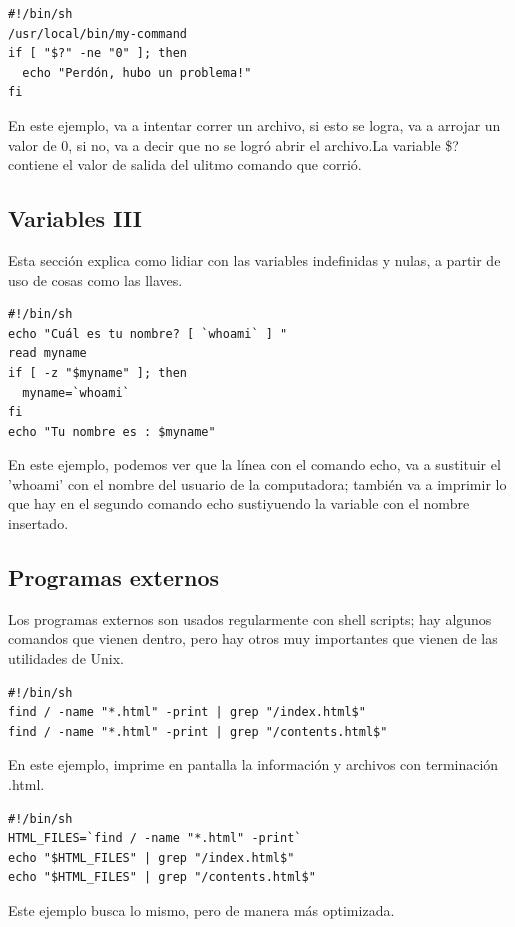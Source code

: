 \documentclass[a4paper]{article}
\begin{document}
\begin{verbatim}
#!/bin/sh
/usr/local/bin/my-command
if [ "$?" -ne "0" ]; then
  echo "Perdón, hubo un problema!"
fi
\end{verbatim}
En este ejemplo, va a intentar correr un archivo, si esto se logra, va a arrojar un valor de 0, si no, va a decir que no se logró abrir el archivo.La variable \$? contiene el valor de salida del ulitmo comando que corrió.

\subsection{Variables III}
Esta sección explica como lidiar con las variables indefinidas y nulas, a partir de uso de cosas como las llaves.

\begin{verbatim}
#!/bin/sh
echo "Cuál es tu nombre? [ `whoami` ] "
read myname
if [ -z "$myname" ]; then
  myname=`whoami`
fi
echo "Tu nombre es : $myname"
\end{verbatim}
En este ejemplo, podemos ver que la línea con el comando echo, va a sustituir el 'whoami' con el nombre del usuario de la computadora; también va a imprimir lo que hay en el segundo comando echo sustiyuendo la variable con el nombre insertado. 
\subsection{Programas externos}
Los programas externos son usados regularmente con shell scripts; hay algunos comandos que vienen dentro, pero hay otros muy importantes que vienen de las utilidades de Unix.
\begin{verbatim}
#!/bin/sh
find / -name "*.html" -print | grep "/index.html$"
find / -name "*.html" -print | grep "/contents.html$"
\end{verbatim}
En este ejemplo, imprime en pantalla la información y archivos con terminación .html.

\begin{verbatim}
#!/bin/sh
HTML_FILES=`find / -name "*.html" -print`
echo "$HTML_FILES" | grep "/index.html$"
echo "$HTML_FILES" | grep "/contents.html$"
\end{verbatim}
Este ejemplo busca lo mismo, pero de manera más optimizada. 
\end{document}

